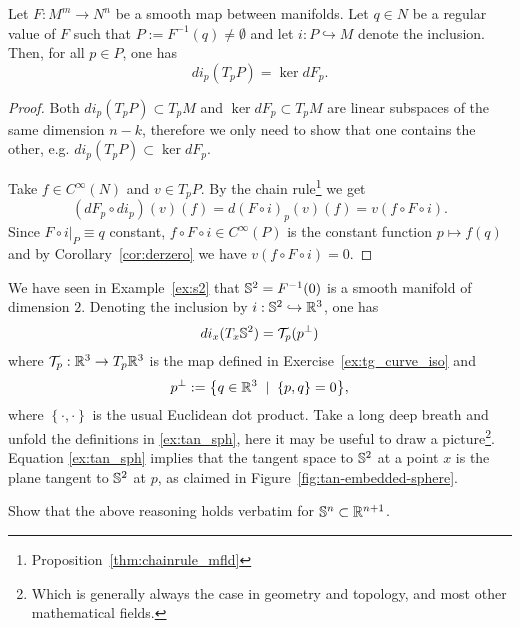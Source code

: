 \begin{proposition}
  Let $F:M^m\to N^n$ be a smooth map between manifolds.
  Let $q\in N$ be a regular value of $F$ such that $P:=F^{-1}(q)\neq\emptyset$ and let $i:P\hookrightarrow M$ denote the inclusion.
  Then, for all $p\in P$, one has
  \begin{equation}
    d i_p(T_p P) = \ker dF_p.
  \end{equation}
\end{proposition}
\begin{proof}
  Both $d i_p(T_p P)\subset T_p M$ and $\ker dF_p \subset T_p M$ are linear subspaces of the same dimension $n-k$, therefore we only need to show that one contains the other, e.g. $d i_p(T_p P) \subset \ker dF_p$.

  Take $f\in C^\infty(N)$ and $v\in T_p P$. By the chain rule\footnote{Proposition~\ref{thm:chainrule_mfld}} we get
  \begin{equation}
    (d F_p \circ d i_p)(v)(f) = d(F\circ i)_p(v)(f) = v(f\circ F\circ i).
  \end{equation}
  Since $F\circ i\big|_{P} \equiv q$ constant, $f\circ F\circ i\in C^\infty(P)$ is the constant function $p \mapsto f(q)$ and by Corollary~\ref{cor:derzero} we have $v(f\circ F\circ i)=0$.
\end{proof}

\begin{example}
  We have seen in Example~\ref{ex:s2} that $\mathbb{S}^2 = F^{-1}(0)$ is a smooth manifold of dimension $2$.
  Denoting the inclusion by $i:\mathbb{S}^2 \hookrightarrow\mathbb{R}^3$, one has
  \begin{equation}\label{ex:tan_sph}
    di_x(T_x\mathbb{S}^2) = \mathcal{T}_p(p^\perp)
  \end{equation}
  where $\mathcal{T}_p:\mathbb{R}^3\to T_p\mathbb{R}^3$ is the map defined in Exercise~\ref{ex:tg_curve_iso} and
  \begin{equation}
    p^\perp := \big\{q\in\mathbb{R}^3 \;\mid\; \left\lbrace p, q\right\rbrace = 0\big\},
  \end{equation}
  where $\left\lbrace\cdot,\cdot\right\rbrace$ is the usual Euclidean dot product.
  Take a long deep breath and unfold the definitions in \eqref{ex:tan_sph}, here it may be useful to draw a picture\footnote{Which is generally always the case in geometry and topology, and most other mathematical fields.}. 
  Equation \eqref{ex:tan_sph} implies that the tangent space to $\mathbb{S}^2$ at a point $x$  is the plane tangent to $\mathbb{S}^2$ at $p$, as claimed in Figure~\ref{fig:tan-embedded-sphere}.
\end{example}

\begin{exercise}
  Show that the above reasoning holds verbatim for $\mathbb{S}^n\subset\mathbb{R}^{n+1}$.
\end{exercise}

